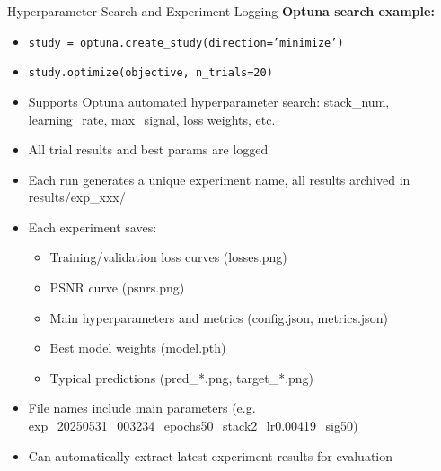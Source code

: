 \documentclass{beamer}
\begin{document}
\begin{frame}{Hyperparameter Search and Experiment Logging}
\textbf{Optuna search example:}
\begin{itemize}
    \item \texttt{study = optuna.create\_study(direction='minimize')}
    \item \texttt{study.optimize(objective, n\_trials=20)}
\end{itemize}
\vspace{0.5em}
\begin{itemize}
    \item Supports Optuna automated hyperparameter search: stack\_num, learning\_rate, max\_signal, loss weights, etc.
    \item All trial results and best params are logged
    \item Each run generates a unique experiment name, all results archived in results/exp\_xxx/
    \item Each experiment saves:
    \begin{itemize}
        \item Training/validation loss curves (losses.png)
        \item PSNR curve (psnrs.png)
        \item Main hyperparameters and metrics (config.json, metrics.json)
        \item Best model weights (model.pth)
        \item Typical predictions (pred\_*.png, target\_*.png)
    \end{itemize}
    \item File names include main parameters (e.g. exp\_20250531\_003234\_epochs50\_stack2\_lr0.00419\_sig50)
    \item Can automatically extract latest experiment results for evaluation
\end{itemize}
\end{frame}
\end{document}
